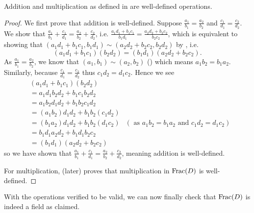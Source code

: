 \begin{proposition}
    Addition and multiplication as defined in  are well-defined operations.
\end{proposition}
\begin{proof}
    We first prove that addition is well-defined. Suppose $\frac{a_1}{b_1} = \frac{a_2}{b_2}$ and $\frac{c_1}{d_1} = \frac{c_2}{d_2}$. We show that $\frac{a_1}{b_1} + \frac{c_1}{d_1} = \frac{a_2}{b_2} + \frac{c_2}{d_2}$, i.e. $\frac{a_1d_1+b_1c_1}{b_1d_1} = \frac{a_2d_2 + b_2c_2}{b_2c_2}$, which is equivalent to showing that $(a_1d_1+b_1c_1, b_1d_1) \mathrel{\sim} (a_2d_2+b_2c_2, b_2d_2)$ by , i.e.
    \[
        (a_1d_1+b_1c_1)(b_2d_2) = (b_1d_1)(a_2d_2+b_2c_2).
    \]
    As $\frac{a_1}{b_1} = \frac{a_2}{b_2}$, we know that $(a_1, b_1) \mathrel{\sim} (a_2, b_2)$ () which means $a_1b_2 = b_1a_2$. Similarly, because $\frac{c_1}{d_1} = \frac{c_2}{d_2}$ thus $c_1d_2 = d_1c_2$. Hence we see
    \begin{align*}
        &(a_1d_1+b_1c_1)(b_2d_2)\\
        &= a_1d_1b_2d_2 + b_1c_1b_2d_2\\
        &= a_1b_2d_1d_2 + b_1b_2c_1d_2\\
        &= (a_1b_2)d_1d_2 + b_1b_2(c_1d_2)\\
        &= (b_1a_2)d_1d_2 + b_1b_2(d_1c_2) & (\text{ as } a_1b_2 = b_1a_2 \text{ and } c_1d_2 = d_1c_2)\\
        &= b_1d_1a_2d_2 + b_1d_1b_2c_2\\
        &= (b_1d_1)(a_2d_2 + b_2c_2)
    \end{align*}
    so we have shown that $\frac{a_1}{b_1} + \frac{c_1}{d_1} = \frac{a_2}{b_2} + \frac{c_2}{d_2}$, meaning addition is well-defined.

    For multiplication,  (later) proves that multiplication in $\mathrm{Frac}(D)$ is well-defined.
\end{proof}

With the operations verified to be valid, we can now finally check that $\mathrm{Frac}(D)$ is indeed a field as claimed.


